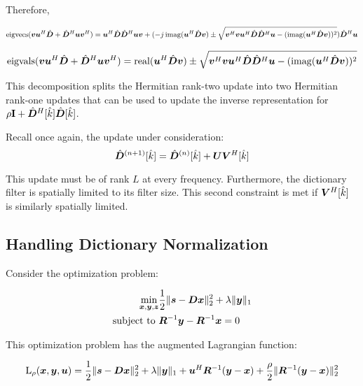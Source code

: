 Therefore,

\begin{equation}
\operatorname{eigvecs}
(
\bm{v}\bm{u}^H\hat{\bm{D}} + \hat{\bm{D}}^H\bm{u}\bm{v}^H
) = 
\bm{u}^H\hat{\bm{D}}\hat{\bm{D}}^H\bm{u}\bm{v} +
(-j\operatorname{imag}(\bm{u}^H\hat{\bm{D}}\bm{v}) \pm \sqrt{\bm{v}^H\bm{v}\bm{u}^H\hat{\bm{D}}\hat{\bm{D}}^H\bm{u} - (\operatorname{imag}(\bm{u}^H\hat{\bm{D}}\bm{v}))^2})\hat{\bm{D}}^H\bm{u}
\end{equation}

\begin{equation}
\operatorname{eigvals}(
\bm{v}\bm{u}^H\hat{\bm{D}} + \hat{\bm{D}}^H\bm{u}\bm{v}^H
)
= \operatorname{real}(\bm{u}^H\hat{\bm{D}}\bm{v}) \pm \sqrt{\bm{v}^H\bm{v}\bm{u}^H\hat{\bm{D}}\hat{\bm{D}}^H\bm{u} - (\operatorname{imag}(\bm{u}^H\hat{\bm{D}}\bm{v}))^2}
\end{equation}

This decomposition splits the Hermitian rank-two update into two Hermitian rank-one updates that can be used to update the inverse representation for $\rho{\bf I} + \hat{\bm{D}}^H[\hat{k}]\hat{\bm{D}}[\hat{k}]$.

Recall once again, the update under consideration:
\begin{equation}
\hat{\bm{D}}^{(n + 1)}[\hat{k}] = \hat{\bm{D}}^{(n)}[\hat{k}] + \bm{U}\bm{V}^H[\hat{k}]
\end{equation}

This update must be of rank $L$ at every frequency. Furthermore, the dictionary filter is spatially limited to its filter size. This second constraint is met if $\bm{V}^H[\hat{k}]$ is similarly spatially limited.

\subsection{Handling Dictionary Normalization}
Consider the optimization problem:

\begin{equation}
\begin{aligned}
\min_{\bm{x},\bm{y},\bm{z}} & \frac{1}{2}\|\bm{s} -\bm{D}\bm{x}\|_2^2 + \lambda\|\bm{y}\|_1 \\
\text{subject to } & \bm{R}^{-1}\bm{y} - \bm{R}^{-1}\bm{x} = 0 
\end{aligned}
\end{equation}

This optimization problem has the augmented Lagrangian function:

\begin{equation}
\operatorname{L}_{\rho}(\bm{x},\bm{y},\bm{u}) = \frac{1}{2}\|\bm{s} - \bm{D}\bm{x}\|_2^2 + \lambda\|\bm{y}\|_1 + \bm{u}^H\bm{R}^{-1}(\bm{y} - \bm{x})  + \frac{\rho}{2}\|\bm{R}^{-1}(\bm{y} - \bm{x})\|_2^2
\end{equation} 

